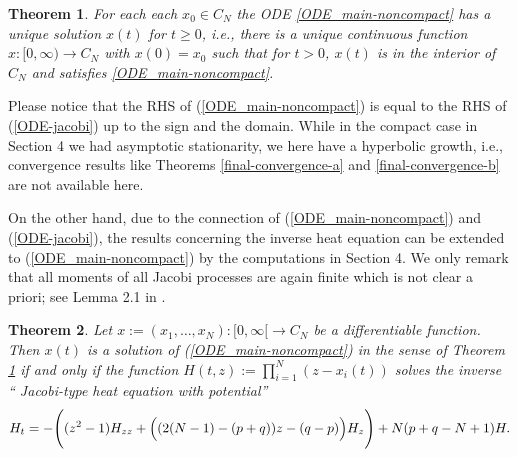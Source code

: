 \documentclass[reqno]{amsart}
\theoremstyle{plain}
\newtheorem{theorem}{Theorem}[section]
\theoremstyle{definition}
\numberwithin{equation}{section}
\begin{document}
 \begin{theorem}\label{main-solutions-ode-noncompact}
          For each
		 each $x_0\in C_N$ the ODE \eqref{ODE_main-noncompact} has a unique 
		 solution $x(t)$ for $t\geq0$, i.e., there is a unique continuous function $x:[0,\infty)\to C_N$ with $x(0)=x_0$ such that
		  for $t>0$, $x(t)$ is in the interior of  $ C_N$ and  satisfies \eqref{ODE_main-noncompact}.
 \end{theorem}
 
 Please notice that the RHS of (\ref{ODE_main-noncompact}) is equal to  the  RHS of (\ref{ODE-jacobi}) up to the sign and the domain.
 While in the compact case in Section 4 we had asymptotic stationarity, we here have a hyperbolic growth, i.e., convergence results like
 Theorems \ref{final-convergence-a} and  \ref{final-convergence-b} are not available here.

 On the other hand, due to the connection of  (\ref{ODE_main-noncompact}) and (\ref{ODE-jacobi}), the results concerning the inverse heat equation can be
 extended to (\ref{ODE_main-noncompact})  by the computations in Section 4. We only remark that all moments of all Jacobi processes are again
 finite  which  is not clear a priori;
see Lemma 2.1 in \cite{RV2}.
 

 
\begin{theorem}\label{heat-equation-jacobi-noncompact}
  Let $x:=(x_1,\ldots,x_N):[0,\infty[\to C_N$ be a differentiable function.
      Then  $x(t)$ is a solution of (\ref{ODE_main-noncompact})
in the sense of Theorem \ref{main-solutions-ode-noncompact}
      if and only if the function $H(t,z):=\prod_{i=1}^N (z-x_i(t))$
      solves the inverse `` Jacobi-type heat equation with potential''
 \begin{equation}\label{heat-jacobi-noncompact}
   H_t=  -\Biggl( (z^2-1) H_{zz}+ \Bigl((2(N-1)-(p+q))z- (q-p)\Bigr) H_{z} \Biggr) +N(p+q-N+1)H.
   \end{equation}
 \end{theorem}
\end{document}
